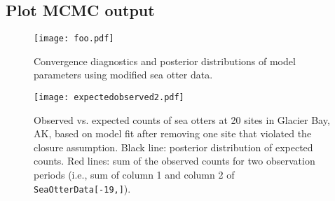 \documentclass[12pt,letterpaper,final]{article}\usepackage[]{graphicx}\usepackage[]{color}
\begin{document}
\subsection{Plot MCMC output}



\begin{center}
  \begin{figure}[H]
    \texttt{[image: foo.pdf]}
    \caption[Convergence and posterior distributions -- modified
    data]{Convergence diagnostics and posterior distributions of model
    parameters using modified sea otter data.}
  \end{figure}
\end{center}



\begin{center}
  \begin{figure}[H]
    \texttt{[image: expectedobserved2.pdf]}
    \caption[Observed vs. expected -- modified data]{Observed
      vs. expected counts of sea otters at 20 sites in Glacier Bay,
      AK, based on model fit after removing one site that violated the
      closure assumption. Black line: posterior distribution of
      expected counts. Red lines: sum of the observed counts for two
      observation periods (i.e., sum of column 1 and column 2 of \texttt{SeaOtterData[-19,]}).}
  \end{figure}
\end{center}
\end{document}
